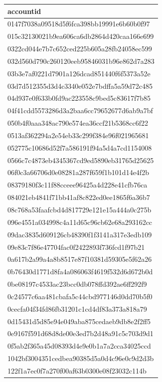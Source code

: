 \begin{tabular}{l}
\toprule
accountid \\
\midrule
0147f7038a09518d5f6fca398bb19991e6b60b0f97 \\
015c32130021b9ea606ca6db2864d420caa166e699 \\
0322cd044e7b7c652ced225b605a28fb24058ec599 \\
032d560d790c260120eeb95846031b96e862d7a283 \\
03b3e7af0221d7901a126dcad851440f6f5373a52e \\
03d7d512355d3d4c3340e052e7bdffa5a59d72c485 \\
04d937e0f633b0fd9ac223558c9bed5c83617f7b85 \\
04f41cdd5573286d3a2baa6cc79652677d6ab9a7bf \\
050b4f0aaa348ac790e574ea36ccf21b5368cc6f22 \\
0513af362294a2e54eb33c299f384e96f021965681 \\
052775c10686d52f7a586191f94a5d4a7cd1154008 \\
0566c7c4873eb4345367cd9ed5890eb31765d25625 \\
06f0c3a66706d0e08281a287f659f1b101d14e4f2b \\
08379180f3c11f88cceee96425a4d228e41cfb76ca \\
084021eb4841f71bb41af8c822ed0ee1865f6a36b7 \\
08c768a53faafcbd4d817729e121e15a444a0c275b \\
096e4551a034998c4a11d65c96cb62e68a293162cc \\
09dac3835d609126cb48390f1f3141a317e3edb109 \\
09e83c7f86e47704fac0f2422893f736fcd1f97b21 \\
0a617b2a99a4a8b8517e87f10381d59305e5f62a26 \\
0b76430d1771d8fa4a086063f4619f532d6d672b0d \\
0be08197c4533ac23bcc0db078ffd392ae6ff292f9 \\
0c24577c6aa481cbafa5c44cbd977146d0dd70b5f0 \\
0cecfa04f34fd86fb31201c1cd4df83a373a818a79 \\
0d15431d5d85e94e049aba875cedaeb9db8e2f2ff5 \\
0e9167f591d68d8de00e3ed7b2d48a91c5c703d9d1 \\
0f5ab2f365a45d08393d4e9e0b1a7a2cca34025ccd \\
1042bf3004351cedbea90385d5a0d4c96e0c9d2d3b \\
122f1a7ec0f7a270f00af63b0300e08f23032c114b \\

\end{tabular}
